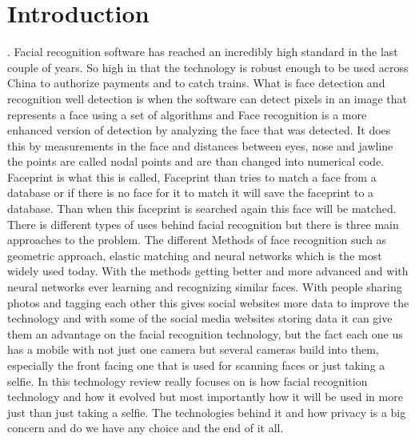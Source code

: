 \documentclass[report]{IEEEtran}
\begin{document}
\section{Introduction}.\newline
Facial recognition software has reached an incredibly high standard in the last couple of years. So high in that the technology is robust enough to be used across China to authorize payments and to catch trains.
What is face detection and recognition well detection is when the software can detect pixels in an image that represents a face using a set of algorithms and Face recognition is a more enhanced version of detection by analyzing the face that was detected. It does this by measurements in the face and distances between eyes, nose and jawline the points are called nodal points and are than changed into numerical code. Faceprint is what this is called, Faceprint than tries to match a face from a database or if there is no face for it to match it will save the faceprint to a database. Than when this faceprint is searched again this face will be matched. There is different types of uses behind facial recognition but there is three main approaches to the problem. The different Methods of face recognition such as geometric approach, elastic matching and neural networks which is the most widely used today\cite{methods}.
With the methods getting better and more advanced and with neural networks ever learning and recognizing similar faces. With people sharing photos and tagging each other this gives social websites more data to improve the technology and with some of the social media websites storing data it can give them an advantage on the facial recognition technology, but the fact each one us has a mobile with not just one camera but several cameras build into them, especially the front facing one that is used for scanning faces or just taking a selfie.
In this technology review really focuses on is how facial recognition technology and how it evolved but most importantly how it will be used in more just than just taking a selfie. The technologies behind it and how privacy is a big concern and do we have any choice and the end of it all. 
\end{document}
